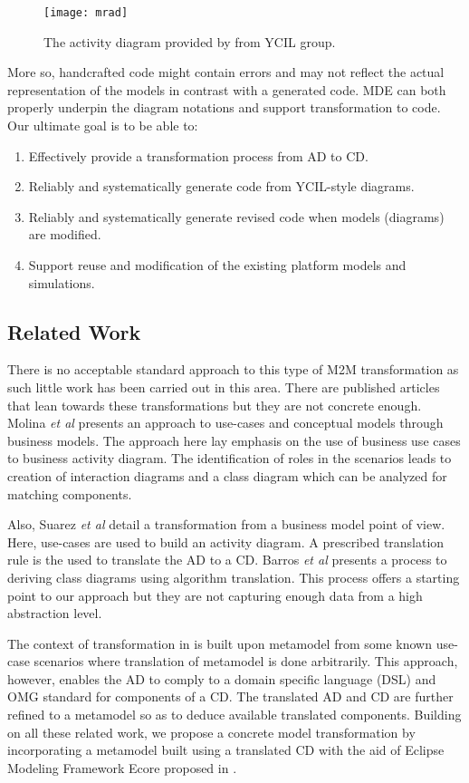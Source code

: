 \documentclass[10pt]{article}
\begin{document}
\begin{figure}[!ht]
  \centering
   \texttt{[image: mrad]}
  \caption{The activity diagram provided by \cite{Read2011} from YCIL group.}
  \label{fig:mrad}
\end{figure}
More so, handcrafted code might contain errors and may not reflect the actual representation of the models in contrast with a generated code. MDE can both properly underpin the diagram notations and support transformation to code. Our ultimate goal is to be able to:
\begin{enumerate}
\item Effectively provide a transformation process from AD to CD.
\item Reliably and systematically generate code from YCIL-style diagrams.
\item Reliably and systematically generate revised code when models (diagrams) are modified.
\item Support reuse and modification of the existing platform models and simulations.
\end{enumerate}

	\subsection{Related Work}
There is no acceptable standard approach to this type of M2M transformation as such little work has been carried out in this area. There are published articles that lean towards these transformations but they are not concrete enough. Molina \textit{et al} \cite{Molina} presents an approach to use-cases and conceptual models through business models. The approach here lay emphasis on the use of business use cases to business activity diagram. The identification of roles in the scenarios leads to creation of interaction diagrams and a class diagram which can be analyzed for matching components.

Also, Suarez \textit{et al} \cite{Suarez} detail a transformation from a business model point of view. Here, use-cases are used to build an activity diagram. A prescribed translation rule is the used to translate the AD to a CD. Barros \textit{et al} \cite{Barros_fromactivity} presents a process to deriving class diagrams using algorithm translation. This process offers a starting point to our approach but they are not capturing enough data from a high abstraction level.

The context of transformation in \cite{Barros_fromactivity} is built upon metamodel from some known use-case scenarios where translation of metamodel is done arbitrarily. This approach, however, enables the AD to comply to a domain specific language (DSL) and OMG standard for components of a CD. The translated AD and CD are further refined to a metamodel so as to deduce available translated components. Building on all these related work, we propose a concrete model transformation by incorporating a metamodel built using a translated CD with the aid of Eclipse Modeling Framework Ecore proposed in \cite{Johannes}.
	
\end{document}
